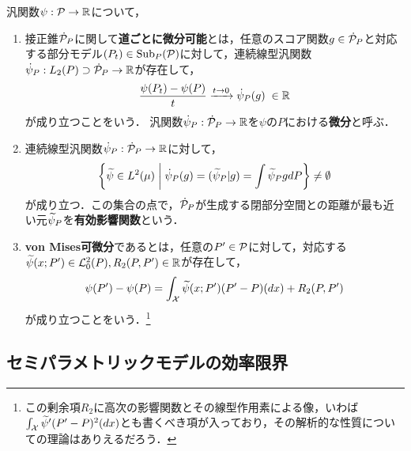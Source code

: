 \documentclass[uplatex, dvipdfmx]{jsarticle}
\newcommand{\Sub}{\mathrm{Sub}}
\begin{document}
\begin{definition}
    汎関数$\psi:\P\to\R$について，
    \begin{enumerate}
        \item 接正錐$\dot{\P}_P$に関して\textbf{道ごとに微分可能}とは，任意のスコア関数$g\in\dot{\P}_P$と対応する部分モデル$(P_t)\in\Sub_P(\P)$に対して，連続線型汎関数$\dot{\psi}_P:L_2(P)\supset\dot{\P}_P\to\R$が存在して，
        \[\frac{\psi(P_t)-\psi(P)}{t}\xrightarrow{t\to0}\dot{\psi}_P(g)\;\in\R\]
        が成り立つことをいう．
        汎関数$\dot{\psi}_P:\dot{\P}_P\to\R$を$\psi$の$P$における\textbf{微分}と呼ぶ．
        \item 連続線型汎関数$\dot{\psi}_P:\dot{\P}_P\to\R$に対して，
        \[\Brace{\wt{\psi}\in L^2(\mu)\;\middle|\;\dot{\psi}_P(g)=(\wt{\psi}_P|g)=\int\wt{\psi}_PgdP}\ne\emptyset\]
        が成り立つ．この集合の点で，$\dot{\P}_P$が生成する閉部分空間との距離が最も近い元$\wt{\psi}_P$を\textbf{有効影響関数}という．
        \item \textbf{von Mises可微分}であるとは，任意の$P'\in\P$に対して，対応する$\wt{\psi}(x;P')\in\L^2_0(P),R_2(P,P')\in\R$が存在して，
        \[\psi(P')-\psi(P)=\int_\X\wt{\psi}(x;P')(P'-P)(dx)+R_2(P,P')\]
        が成り立つことをいう．\footnote{この剰余項$R_2$に高次の影響関数とその線型作用素による像，いわば$\int_\X\wt{\psi}'(P'-P)^2(dx)$とも書くべき項が入っており，その解析的な性質についての理論はありえるだろう．}
    \end{enumerate}
\end{definition}


\subsection{セミパラメトリックモデルの効率限界}
\end{document}
